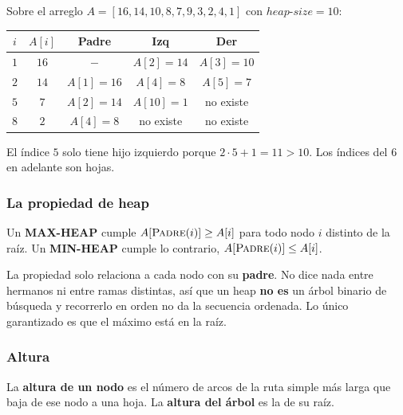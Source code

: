 \documentclass[11pt,letterpaper]{article}
\begin{document}
\begin{ejemplo}
  Sobre el arreglo
  $A = [16, 14, 10, 8, 7, 9, 3, 2, 4, 1]$ con
  $\mathit{heap\text{-}size} = 10$:
  \begin{center}
  \begin{tabular}{ccccc}
    \toprule
    $i$ & $A[i]$ & \textbf{Padre} & \textbf{Izq} & \textbf{Der} \\
    \midrule
    $1$ & $16$ & $-$            & $A[2] = 14$ & $A[3] = 10$ \\
    $2$ & $14$ & $A[1] = 16$    & $A[4] = 8$  & $A[5] = 7$ \\
    $5$ & $7$  & $A[2] = 14$    & $A[10] = 1$ & no existe \\
    $8$ & $2$  & $A[4] = 8$     & no existe   & no existe \\
    \bottomrule
  \end{tabular}
  \end{center}
  El índice $5$ solo tiene hijo izquierdo porque
  $2 \cdot 5 + 1 = 11 > 10$. Los índices del $6$ en adelante son
  hojas.
\end{ejemplo}

\subsubsection*{La propiedad de heap}

\begin{definicion}
  Un \textbf{MAX-HEAP} cumple
  $A[\textsc{Padre}(i)] \geq A[i]$ para todo nodo $i$ distinto de la
  raíz. Un \textbf{MIN-HEAP} cumple lo contrario,
  $A[\textsc{Padre}(i)] \leq A[i]$.
\end{definicion}

\begin{ojo}
  La propiedad solo relaciona a cada nodo con su \textbf{padre}. No
  dice nada entre hermanos ni entre ramas distintas, así que un heap
  \textbf{no es} un árbol binario de búsqueda y recorrerlo en orden no
  da la secuencia ordenada. Lo único garantizado es que el máximo está
  en la raíz.
\end{ojo}

\subsubsection*{Altura}

La \textbf{altura de un nodo} es el número de arcos de la ruta simple
más larga que baja de ese nodo a una hoja. La \textbf{altura del
árbol} es la de su raíz.
\end{document}

